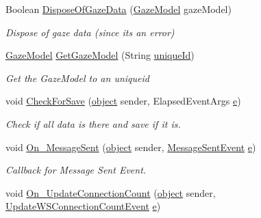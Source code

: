 \begin{DoxyCompactItemize}
Boolean \hyperlink{class_web_analyzer_1_1_controller_1_1_test_controller_a99b6f672f4ef0293ac70edb20e1c7cdb}{Dispose\+Of\+Gaze\+Data} (\hyperlink{class_web_analyzer_1_1_models_1_1_data_model_1_1_gaze_model}{Gaze\+Model} gaze\+Model)
\begin{DoxyCompactList}\small\item\em Dispose of gaze data (since its an error) \end{DoxyCompactList}\item 
\hyperlink{class_web_analyzer_1_1_models_1_1_data_model_1_1_gaze_model}{Gaze\+Model} \hyperlink{class_web_analyzer_1_1_controller_1_1_test_controller_ad375d558e5d63a79680f3fe53f1326b4}{Get\+Gaze\+Model} (String \hyperlink{_u_i_2_h_t_m_l_resources_2js_2lib_2underscore_8min_8js_af690ff5521d79c7128861033ae80ae17}{unique\+Id})
\begin{DoxyCompactList}\small\item\em Get the Gaze\+Model to an uniqueid \end{DoxyCompactList}\item 
void \hyperlink{class_web_analyzer_1_1_controller_1_1_test_controller_a19c13e671b0a950a1b012424fd7c2560}{Check\+For\+Save} (\hyperlink{_u_i_2_h_t_m_l_resources_2js_2lib_2underscore_8min_8js_aae18b7515bb2bc4137586506e7c0c903}{object} sender, Elapsed\+Event\+Args \hyperlink{_u_i_2_h_t_m_l_resources_2js_2lib_2bootstrap_8min_8js_ab5902775854a8b8440bcd25e0fe1c120}{e})
\begin{DoxyCompactList}\small\item\em Check if all data is there and save if it is. \end{DoxyCompactList}\item 
void \hyperlink{class_web_analyzer_1_1_controller_1_1_test_controller_ab70718909a47aded762d0021e5ccb7b2}{On\+\_\+\+Message\+Sent} (\hyperlink{_u_i_2_h_t_m_l_resources_2js_2lib_2underscore_8min_8js_aae18b7515bb2bc4137586506e7c0c903}{object} sender, \hyperlink{class_web_analyzer_1_1_events_1_1_message_sent_event}{Message\+Sent\+Event} \hyperlink{_u_i_2_h_t_m_l_resources_2js_2lib_2bootstrap_8min_8js_ab5902775854a8b8440bcd25e0fe1c120}{e})
\begin{DoxyCompactList}\small\item\em Callback for Message Sent Event. \end{DoxyCompactList}\item 
void \hyperlink{class_web_analyzer_1_1_controller_1_1_test_controller_aab50b4935b131507a7dbfae94aa632df}{On\+\_\+\+Update\+Connection\+Count} (\hyperlink{_u_i_2_h_t_m_l_resources_2js_2lib_2underscore_8min_8js_aae18b7515bb2bc4137586506e7c0c903}{object} sender, \hyperlink{class_web_analyzer_1_1_events_1_1_update_w_s_connection_count_event}{Update\+W\+S\+Connection\+Count\+Event} \hyperlink{_u_i_2_h_t_m_l_resources_2js_2lib_2bootstrap_8min_8js_ab5902775854a8b8440bcd25e0fe1c120}{e})

\end{DoxyCompactItemize}
